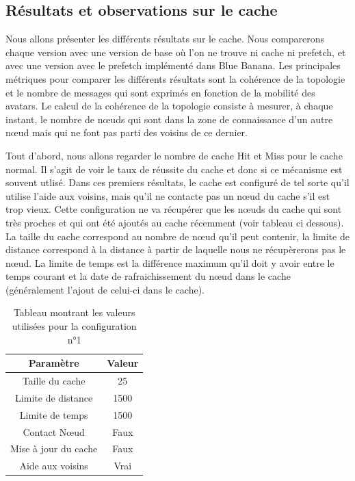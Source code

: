\subsection{Résultats et observations sur le cache}
\label{resObsCache}

Nous allons présenter les différents résultats sur le cache. Nous comparerons chaque version avec une version de base où l'on ne trouve ni cache ni prefetch, et avec une version avec le prefetch implémenté dans Blue Banana.
Les principales métriques pour comparer les différents résultats sont la cohérence de la topologie et le nombre de messages qui sont exprimés en fonction de la mobilité des avatars. Le calcul de la cohérence de la topologie consiste à mesurer, à chaque instant, le nombre de nœuds qui sont dans la zone de connaissance d'un autre nœud mais qui ne font pas parti des voisins de ce dernier.

\par Tout d'abord, nous allons regarder le nombre de cache Hit et Miss pour le cache normal. Il s'agit de voir le taux de réussite du cache et donc si ce mécanisme est souvent utlisé. Dans ces premiers résultats, le cache est configuré de tel sorte qu'il utilise l'aide aux voisins, mais qu'il ne contacte pas un nœud du cache s'il est trop vieux. Cette configuration ne va récupérer que les nœuds du cache qui sont très proches et qui ont été ajoutés au cache récemment (voir tableau ci dessous). La taille du cache correspond au nombre de nœud qu'il peut contenir, la limite de distance correspond à la distance à partir de laquelle nous ne récupèrerons pas le nœud. La limite de temps est la différence maximum qu'il doit y avoir entre le temps courant et la date de rafraichissement du nœud dans le cache (généralement l'ajout de celui-ci dans le cache). 
\begin{table}[!h]
  \begin{center}
    \begin{tabular}{|c|c|}
      \hline
      Paramètre & Valeur\\
      \hline
      Taille du cache & 25\\
      Limite de distance &  1500\\
      Limite de temps & 1500\\
      Contact Nœud & Faux\\
      Mise à jour du cache & Faux\\
      Aide aux voisins & Vrai\\
      \hline
    \end{tabular}
  \end{center}
  \label{tab:config1}
  \caption{Tableau montrant les valeurs utilisées pour la configuration n°1}
\end{table}


